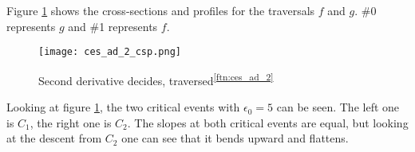 	Figure \ref{fig:ces_ad_2_csp} shows the cross-sections and profiles for the traversals $f$ and $g$. \#0 represents $g$ and \#1 represents $f$.
	
\begin{figure}[H]
	\centering
    
    \texttt{[image: ces\_ad\_2\_csp.png]}
		
	\caption{Second derivative decides, traversed\textsuperscript{\ref{ftn:ces_ad_2}}}
    \label{fig:ces_ad_2_csp}
\end{figure}
	
	Looking at figure \ref{fig:ces_ad_2_csp}, the two critical events with $\epsilon_0 = 5$ can be seen. The left one is $C_1$, the right one is $C_2$. The slopes at both critical events are equal, but looking at the descent from $C_2$ one can see that it bends upward and flattens.


